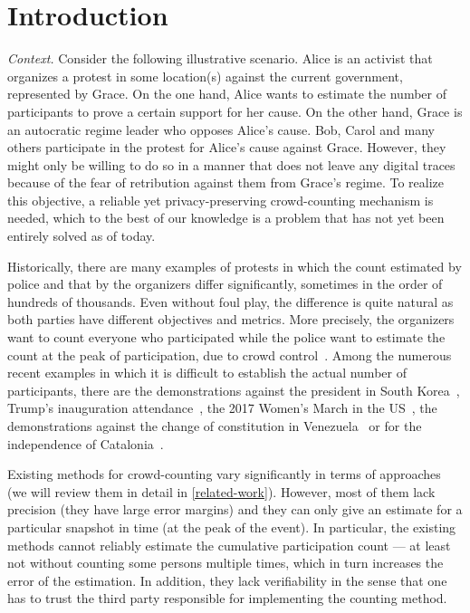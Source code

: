 \section{Introduction}%
\label{Introduction}

\emph{Context.} 
Consider the following illustrative scenario.
Alice is an activist that organizes a protest in some location(s) against the current government, represented by Grace.
On the one hand, Alice wants to estimate the number of participants to prove a certain support for her cause.
On the other hand, Grace is an autocratic regime leader who opposes Alice's cause.
Bob, Carol and many others participate in the protest for Alice's cause against Grace.
However, they might only be willing to do so in a manner that does not leave any digital traces because of the fear of retribution against them from Grace's regime. 
To realize this objective, a reliable yet privacy-preserving crowd-counting mechanism is needed, which to the best of our knowledge is a problem that has not yet been entirely solved as of today.

Historically, there are many examples of protests in which the count estimated by police and that by the organizers differ significantly, sometimes in the order of hundreds of thousands.
Even without foul play, the difference is quite natural as both parties have different objectives and metrics.
More precisely, the organizers want to count everyone who participated while the police want to estimate the count at the peak of participation, due to crowd control~\cite{2016DemonstrationsInSeoul}.
Among the numerous recent examples in which it is difficult to establish the actual number of participants, there are the demonstrations against the president in South Korea~\cite{2016DemonstrationsInSeoul}, Trump's inauguration attendance~\cite{HowWillWeKnowTrumpInauguralCrowdSize}, the 2017 Women's March in the US~\cite{2017WomensMarchesInUS}, the demonstrations against the change of constitution in Venezuela~\cite{AlJazeeraOnVenezuela2017} or for the independence of Catalonia~\cite{CataloniaDemonstrations}.

Existing methods for crowd-counting vary significantly in terms of approaches (we will review them in detail in \cref{related-work}).
However, most of them lack precision (\ie they have large error margins) and they can only give an estimate for a particular snapshot in time (\eg at the peak of the event). 
In particular, the existing methods cannot reliably estimate the cumulative participation count --- at least not without counting some persons multiple times, which in turn increases the error of the estimation.
In addition, they lack verifiability in the sense that one has to trust the third party responsible for implementing the counting method. 

